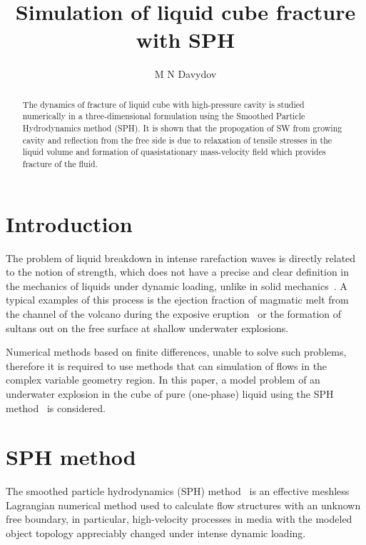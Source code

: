 \documentclass[a4paper]{jpconf}
\begin{document}
\title{Simulation of liquid cube fracture with SPH}

\author{M N Davydov}

\address{Lavrentyev Institute of Hydrodynamics of the Siberian Branch of the Russian Academy of Sciences, Novosibirsk, Russia}



\begin{abstract}
The dynamics of fracture of liquid cube with high-pressure cavity is studied numerically in a three-dimensional formulation using the Smoothed Particle Hydrodynamics method (SPH).  It is shown that the propogation of SW from growing cavity and reflection from the free side is due to relaxation of tensile stresses in the liquid volume and formation of quasistationary mass-velocity field which provides fracture of the fluid. 
\end{abstract}

\section{Introduction}

The problem of liquid breakdown in intense rarefaction waves is directly related to the
notion of strength, which does not have a precise and clear definition in the mechanics of liquids under dynamic
loading, unlike in solid mechanics~\cite{DavydovKedrinskii2008}. A typical examples of this process is the ejection fraction of magmatic melt from the channel of the volcano during the exposive eruption~\cite{Davydov2012a} or the formation of sultans out on the free surface at shallow underwater explosions.


Numerical methods based on finite differences, unable to solve such problems, therefore it is  required to use methods that can simulation of flows in the complex variable geometry region. In this paper, a model problem of an underwater explosion in the cube of pure (one-phase) liquid using the SPH method~\cite{Monaghan2005}  is considered.

\section{SPH method}

The smoothed particle hydrodynamics (SPH) method~\cite{Monaghan1992,Monaghan2005} is an effective meshless Lagrangian numerical
method used to calculate flow structures with an unknown free boundary, in particular, high-velocity processes in
media with the modeled object topology appreciably changed under intense dynamic loading.
\end{document}
